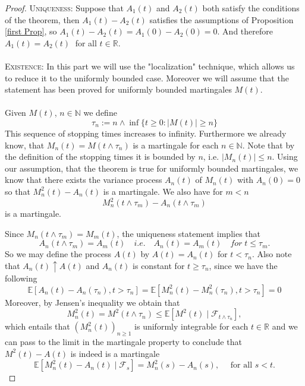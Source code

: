 \documentclass[11pt,a4paper, final]{article}
\theoremstyle{definition}
\begin{document}
\begin{proof}
\textsc{Uniqueness:} Suppose that $A_1(t)$ and $A_2(t)$ both satisfy the conditions of the theorem, then $A_1(t)-A_2(t)$ satisfies the assumptions of Proposition \ref{first Prop}, so $A_1(t)-A_2(t)=A_1(0)-A_2(0)=0$. And therefore $A_1(t)=A_2(t) \;$ for all $t \in \mathbb{R}$. 
\\\\
\textsc{Existence:} In this part we will use the "localization" technique, which allows us to reduce it to the uniformly bounded case. Moreover we will assume that the statement has been proved for uniformly bounded martingales $M(t)$. %
\\\\
Given $M(t)$, $n \in \mathbb{N}$ we define
$$\tau_n := n \wedge \inf\{t \geq 0: |M(t)|\geq n\}$$
This sequence of stopping times increases to infinity. Furthermore we already know, that $M_n(t)=M(t \wedge \tau_n)$ is a martingale for each $n \in \mathbb{N}$. Note that by the definition of the stopping times it is bounded by $n$, i.e. $| M_n(t) |\leq n$. Using our assumption, that the theorem is true for uniformly bounded martingales, we know that there exists the variance process $A_n(t)$ of $M_n(t)$ with $A_n(0)=0$ so that $M_n^2(t)-A_n(t)$ is a martingale. We also have for $m<n$ $$M_n^2(t \wedge \tau_m)-A_n(t \wedge \tau_m)$$ is a martingale.
\newpage

\noindent Since $M_n(t \wedge \tau_m)=M_m(t)$, the uniqueness statement implies that 
$$A_n(t \wedge \tau_m)=A_m(t) \quad i.e.\quad  A_n(t)=A_m(t) \quad for \;t\leq \tau_m.$$
So we may define the process $A(t)$ by $A(t)=A_n(t)$ for $t<\tau_n$. Also note that $A_n(t) \uparrow A(t)$ and $A_n(t)$ is constant for $t\geq \tau_n$, since we have the following
$$\mathbb{E}[A_n(t)-A_n(\tau_n), t>\tau_n]= \mathbb{E}[M_n^2(t)-M_n^2(\tau_n), t>\tau_n]=0$$
Moreover, by Jensen's inequality we obtain that
$$M_n^2(t)=M^2(t \wedge \tau_n) \leq \mathbb{E}[M^2(t) \mid \mathscr{F}_{t \wedge \tau_n}],$$
which entails that $(M_n^2(t))_{n\geq 1}$ is uniformly integrable for each $t \in \mathbb{R}$ and we can pass to the limit in the martingale property to conclude that $M^2(t)-A(t)$ is indeed is a martingale
$$\mathbb{E}[M_n^2(t)-A_n(t) \mid \mathscr{F}_s]=M_n^2(s)-A_n(s), \quad \text{ for all }s<t.$$

\end{proof}
\end{document}
